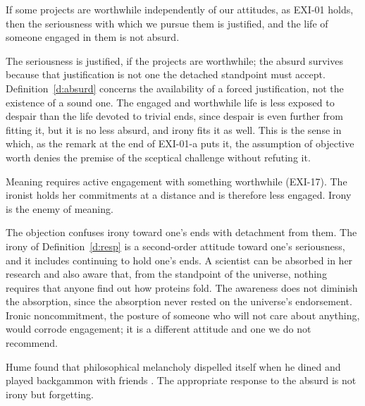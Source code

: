 \documentclass{situationist-preprint}
\begin{document}
\begin{objection}\label{o:worth}
If some projects are worthwhile independently of our attitudes, as EXI-01 holds, then the seriousness with which we pursue them is justified, and the life of someone engaged in them is not absurd.
\end{objection}

\begin{reply}
The seriousness is justified, if the projects are worthwhile; the absurd survives because that justification is not one the detached standpoint must accept. Definition~\ref{d:absurd} concerns the availability of a forced justification, not the existence of a sound one. The engaged and worthwhile life is less exposed to despair than the life devoted to trivial ends, since despair is even further from fitting it, but it is no less absurd, and irony fits it as well. This is the sense in which, as the remark at the end of EXI-01-a puts it, the assumption of objective worth denies the premise of the sceptical challenge without refuting it.
\end{reply}

\begin{objection}\label{o:corrode}
Meaning requires active engagement with something worthwhile (EXI-17). The ironist holds her commitments at a distance and is therefore less engaged. Irony is the enemy of meaning.
\end{objection}

\begin{reply}
The objection confuses irony toward one's ends with detachment from them. The irony of Definition~\ref{d:resp} is a second-order attitude toward one's seriousness, and it includes continuing to hold one's ends. A scientist can be absorbed in her research and also aware that, from the standpoint of the universe, nothing requires that anyone find out how proteins fold. The awareness does not diminish the absorption, since the absorption never rested on the universe's endorsement. Ironic noncommitment, the posture of someone who will not care about anything, would corrode engagement; it is a different attitude and one we do not recommend.
\end{reply}

\begin{objection}\label{o:hume}
Hume found that philosophical melancholy dispelled itself when he dined and played backgammon with friends \citep[1.4.7]{Hume1739}. The appropriate response to the absurd is not irony but forgetting.
\end{objection}
\end{document}
